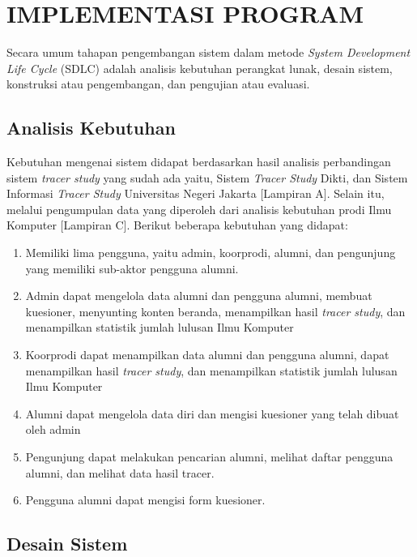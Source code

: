 
\chapter{IMPLEMENTASI PROGRAM}

Secara umum tahapan pengembangan sistem dalam metode \emph{System Development Life Cycle} (SDLC) adalah analisis kebutuhan perangkat lunak, desain sistem, konstruksi atau pengembangan, dan pengujian atau evaluasi.


\section{Analisis Kebutuhan}

Kebutuhan mengenai sistem didapat berdasarkan hasil analisis perbandingan sistem \textit{tracer study} yang sudah ada yaitu, Sistem \textit{Tracer Study} Dikti, dan Sistem Informasi \textit{Tracer Study} Universitas Negeri Jakarta [Lampiran A]. Selain itu, melalui pengumpulan data yang diperoleh dari analisis kebutuhan prodi Ilmu Komputer [Lampiran C]. Berikut beberapa kebutuhan yang didapat:
\begin{enumerate}
	\item Memiliki lima pengguna, yaitu admin, koorprodi, alumni, dan pengunjung yang memiliki sub-aktor pengguna alumni. 
	\item Admin dapat mengelola data alumni dan pengguna alumni, membuat kuesioner, menyunting konten beranda, menampilkan hasil \textit{tracer study}, dan menampilkan statistik jumlah lulusan Ilmu Komputer
	\item Koorprodi dapat menampilkan data alumni dan pengguna alumni, dapat menampilkan hasil \textit{tracer study}, dan menampilkan statistik jumlah lulusan Ilmu Komputer
	\item Alumni dapat mengelola data diri dan mengisi kuesioner yang telah dibuat oleh admin
	\item Pengunjung dapat melakukan pencarian alumni, melihat daftar pengguna alumni, dan melihat data hasil tracer. 
	\item Pengguna alumni dapat mengisi form kuesioner.
\end{enumerate}

\section{Desain Sistem}

